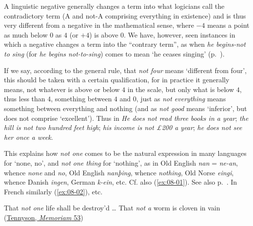 \label{ch:8}
A linguistic negative generally changes a term into what logicians call the contradictory term (A and not-A comprising everything in existence) and is thus very different from a negative in the mathematical sense, where \(-4\) means a point as much below 0 as \(4\) (or \(+4\)) is above \(0\). We have, however, seen instances in which a negative changes a term into the ``contrary term'', as when \textit{he begins-not to sing} (for \textit{he begins not-to-sing}) comes to mean `he ceases singing' (p.~\pageref{para:not-to-sing}).

If we say, according to the general rule, that \textit{not four} means `different from four', this should be taken with a certain qualification, for in practice it generally means, not whatever is above or below \(4\) in the scale, but only what is below \(4\), thus less than \(4\), something between \(4\) and \(0\), just as \textit{not everything} means something between everything and nothing (and as \textit{not good} means `inferior', but does not comprise `excellent'). Thus in \textit{He does not read three books in a year}; \textit{the hill is not two hundred feet high}; \textit{his income is not £200 a year}; \textit{he does not see her once a week}.

This explains how \textit{not one} comes to be the natural expression in many languages for `none, no', and \textit{not one thing} for `nothing', as in Old English \textit{nan} = %
\textit{ne-an}, whence \textit{none} and \textit{no}, Old English \textit{nanþing}, whence \textit{nothing}, Old Norse \textit{eingi}, whence Danish \textit{ingen}, German \textit{k-ein}, etc. Cf. also (\ref{ex:08-01}). See also p.~\pageref{para:kind-of-stronger-no}. In French similarly (\ref{ex:08-02}), etc.

\ea \label{ex:08-01}
That \emph{not one} life shall be destroy'd {\dots} That \emph{not a} worm is cloven in vain\\\hfill(\href{https://en.wikisource.org/wiki/In_Memoriam_(Tennyson)/Canto_53}{Tennyson, \textit{Memoriam} 53})
\z


